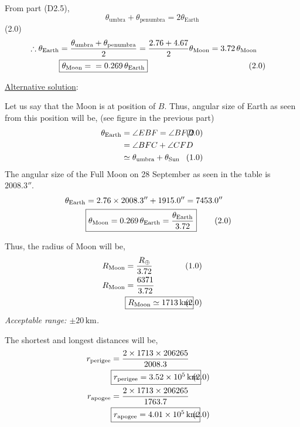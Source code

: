\begin{description}
From part (D2.5),
\[
\theta_{\mathrm{umbra}} + \theta_{\mathrm{penumbra}} = 2\theta_{\mathrm{Earth}}
\]
\hfill(2.0)
\begin{align*}
\therefore \theta_{\mathrm{Earth}}
 &= \frac{\theta_{\mathrm{umbra}} + \theta_{\mathrm{penumbra}}}{2}
 = \frac{2.76 + 4.67}{2}\theta_{\mathrm{Moon}} = 3.72\,\theta_{\mathrm{Moon}}\\
&\fbox{$\theta_{\mathrm{Moon}} = {} = 0.269\,\theta_{\mathrm{Earth}}$}
 & &\hspace{-2em}(2.0)
\end{align*}

\underline{Alternative solution}:

Let us say that the Moon is at position of $B$. Thus, angular size of Earth as seen from
this position will be, (see figure in the previous part)
\begin{align*}
\theta_{\mathrm{Earth}} &= \angle EBF = \angle BFD & &\hspace{-2em}(2.0)\\
 &= \angle BFC + \angle CFD\\
 &\simeq \theta_{\mathrm{umbra}} + \theta_{\mathrm{Sun}} & &\hspace{-2em}(1.0)
\end{align*}
The angular size of the Full Moon on 28 September as seen in the table is $2008.3''$.
\begin{align*}
\theta_{\mathrm{Earth}} &= 2.76\times2008.3'' + 1915.0'' = 7453.0''\\
&\fbox{$\theta_{\mathrm{Moon}} = 0.269\,\theta_{\mathrm{Earth}}
 = \dfrac{\theta_{\mathrm{Earth}}}{3.72}$}
 & &\hspace{-2em}(2.0)
\end{align*}

\item[(D2.7)]
Thus, the radius of Moon will be,
\begin{align*}
R_{\mathrm{Moon}} &= \frac{R_\oplus}{3.72} & &\hspace{-2em}(1.0)\\
R_{\mathrm{Moon}} &= \frac{6371}{3.72}\\
&\fbox{$R_{\mathrm{Moon}} \simeq 1713\,\mathrm{km}$} & &\hspace{-2em}(2.0)
\end{align*}
\emph{Acceptable range: $\pm20\,\mathrm{km}$.}

\item[(D2.8)]
The shortest and longest distances will be,
\begin{align*}
r_{\mathrm{perigee}} &= \frac{2\times1713\times206265}{2008.3}\\
&\fbox{$r_{\mathrm{perigee}} = 3.52\times10^5\,\mathrm{km}$} & &\hspace{-2em}(2.0)\\
r_{\mathrm{apogee}} &= \frac{2\times1713\times206265}{1763.7}\\
&\fbox{$r_{\mathrm{apogee}} = 4.01\times10^5\,\mathrm{km}$} & &\hspace{-2em}(2.0)
\end{align*}


\end{description}
